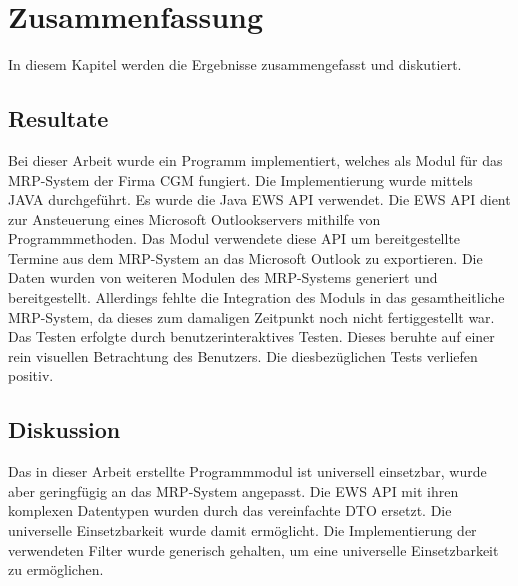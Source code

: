 \chapter {Zusammenfassung}
In diesem Kapitel werden die Ergebnisse zusammengefasst und diskutiert.
\section{Resultate}
Bei dieser Arbeit wurde ein Programm implementiert, welches als Modul für das MRP-System der Firma CGM fungiert. Die Implementierung wurde mittels JAVA durchgeführt. Es wurde die Java EWS API verwendet. Die EWS API dient zur Ansteuerung eines Microsoft Outlookservers mithilfe von Programmmethoden. Das Modul verwendete diese API um bereitgestellte Termine aus dem MRP-System an das Microsoft Outlook zu exportieren. Die Daten wurden von weiteren Modulen des MRP-Systems generiert und bereitgestellt. Allerdings fehlte die Integration des Moduls in das gesamtheitliche MRP-System, da dieses zum damaligen Zeitpunkt noch nicht fertiggestellt war. Das Testen erfolgte durch benutzerinteraktives Testen. Dieses beruhte auf einer rein visuellen Betrachtung des Benutzers. Die diesbezüglichen Tests verliefen positiv.
\section{Diskussion}
Das in dieser Arbeit erstellte Programmmodul ist universell einsetzbar, wurde aber geringfügig an das MRP-System angepasst. Die EWS API mit ihren komplexen Datentypen wurden durch das vereinfachte DTO ersetzt. Die universelle Einsetzbarkeit wurde damit ermöglicht. Die Implementierung der verwendeten Filter wurde generisch gehalten, um eine universelle Einsetzbarkeit zu ermöglichen.
